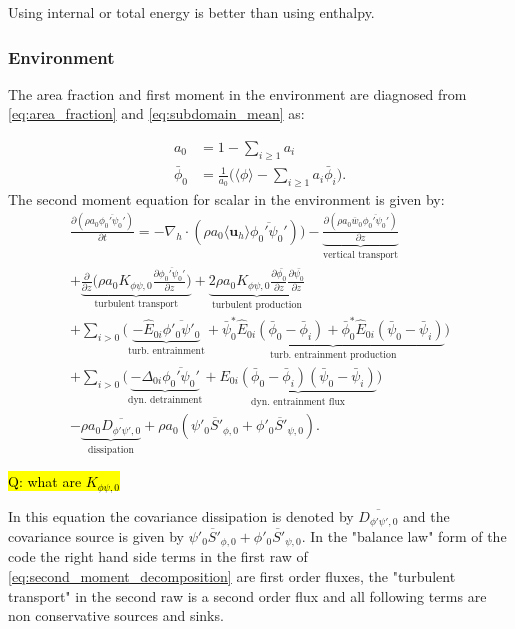 \documentclass{report}
\begin{document}
Using internal or total energy is better than using enthalpy.
\newpage

\subsubsection{Environment} 
The area fraction and first moment in the environment are diagnosed from \eqref{eq:area_fraction} and  \eqref{eq:subdomain_mean} as:

\begin{align}
\label{eq:enviroment}
a_0 & = 1- \sum_{i\ge 1} a_i\\
\bar{\phi}_0 & =\frac{1}{a_0} \Big(\langle \phi \rangle - \sum_{i\ge 1} a_i \bar{\phi}_i \Big).
\end{align}
The second moment equation for scalar in the environment is given by:
\begin{multline}
\frac{\partial (\rho a_0 \overline{\phi_0' \psi_0'})}{\partial t} =
- \nabla_h \cdot (\rho a_0 \langle \mathbf{u}_h \rangle \overline{\phi_0' \psi_0'})) - \underbrace{\frac{\partial (\rho a_0 \overline{w}_0 \overline{\phi_0' \psi_0'})}{\partial z}}_{\text{vertical transport}} \\
+ \underbrace{\frac{\partial}{\partial z}\Bigg(\rho a_0 K_{\phi\psi,0} \frac{\partial\overline{\phi_0' \psi_0'} }{\partial z}\Bigg)}_{\text{turbulent transport}}
+ \underbrace{2\rho a_0 K_{\phi\psi,0} \frac{\partial \bar{\phi_0}}{\partial z}\frac{\partial \bar{\psi_0}}{\partial z}}_{\text{turbulent production}} \\
+ \sum_{i>0}\Bigg( \underbrace{-\hat{E}_{0i} \overline{\phi'_0 \psi'_0}}_{\text{turb. entrainment}} +  
\underbrace{\bar{\psi}^*_0\hat{E}_{0i}(\bar{\phi}_0-\bar{\phi}_i) + \bar{\phi}^*_0\hat{E}_{0i}(\bar{\psi}_0-\bar{\psi}_i)}_{\text{turb. entrainment production}} \Bigg) \\ 
+ \sum_{i>0}{\Bigg(\underbrace{- \Delta_{0i} \overline{\phi_0' \psi_0'}}_{\text{dyn. detrainment}} + \underbrace{E_{0i}(\bar{\phi}_0-\bar{\phi}_i) (\bar{\psi}_0-\bar{\psi}_i)}_{\text{dyn. entrainment flux}}} \Bigg) \\
- \underbrace{ \rho a_0 \overline{D_{\phi' \psi', 0}}}_{\text{dissipation}} + \rho a_0 (\overline{\psi'_0 S'_{\phi,0}} + \overline{\phi'_0 S'_{\psi,0}} ).
\label{eq:subdomain_scalar_variance} 
\end{multline} 

\hl{Q: what are $K_{\phi\psi,0}$}

In this equation the covariance dissipation is denoted by $\overline{D_{\phi' \psi', 0}}$ and the covariance source is given by $\overline{\psi'_0 S'_{\phi,0}} + \overline{\phi'_0 S'_{\psi,0}}$. In the "balance law" form of the code the right hand side terms in the first raw of \eqref{eq:second_moment_decomposition} are first order fluxes, the "turbulent transport" in the second raw is a second order flux and all following terms are non conservative sources and sinks.
\end{document}
